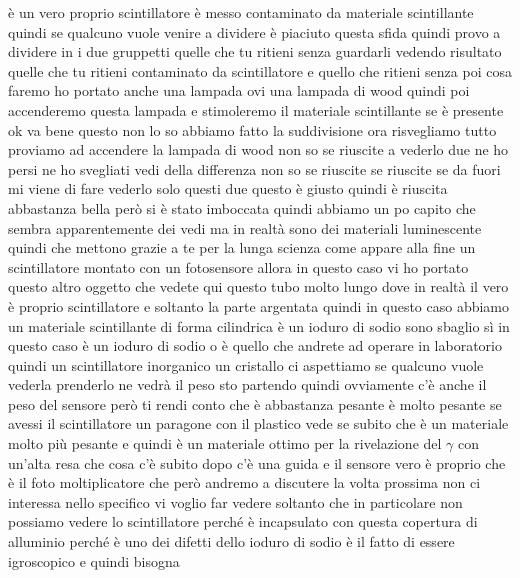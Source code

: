 {è un vero proprio scintillatore è messo contaminato da materiale scintillante quindi se qualcuno vuole venire a dividere è piaciuto questa sfida quindi provo a dividere in i due gruppetti quelle che tu ritieni senza guardarli vedendo risultato quelle che tu ritieni contaminato da scintillatore e quello che ritieni senza poi cosa faremo ho portato anche una lampada ovi una lampada di wood quindi poi accenderemo questa lampada e stimoleremo il materiale scintillante se è presente ok va bene questo non lo so abbiamo fatto la suddivisione ora risvegliamo tutto proviamo ad accendere la lampada di wood non so se riuscite a vederlo due ne ho persi ne ho svegliati vedi della differenza non so se riuscite se riuscite se da fuori mi viene di fare vederlo solo questi due questo è giusto quindi è riuscita abbastanza bella però si è stato imboccata quindi abbiamo un po capito che sembra apparentemente dei vedi ma in realtà sono dei materiali luminescente quindi che mettono grazie a te per la lunga scienza come appare alla fine un scintillatore montato con un fotosensore allora in questo caso vi ho portato questo altro oggetto che vedete qui questo tubo molto lungo dove in realtà il vero è proprio scintillatore e soltanto la parte argentata quindi in questo caso abbiamo un materiale scintillante di forma cilindrica è un ioduro di sodio sono sbaglio sì in questo caso è un ioduro di sodio o è quello che andrete ad operare in laboratorio quindi un scintillatore inorganico un cristallo ci aspettiamo se qualcuno vuole vederla prenderlo ne vedrà il peso sto partendo quindi ovviamente c'è anche il peso del sensore però ti rendi conto che è abbastanza pesante è molto pesante se avessi il scintillatore un paragone con il plastico vede se subito che è un materiale molto più pesante e quindi è un materiale ottimo per la rivelazione del $\gamma$ con un'alta resa che cosa c'è subito dopo c'è una guida e il sensore vero è proprio che è il foto moltiplicatore che però andremo a discutere la volta prossima non ci interessa nello specifico vi voglio far vedere soltanto che in particolare non possiamo vedere lo scintillatore perché è incapsulato con questa copertura di alluminio perché è uno dei difetti dello ioduro di sodio è il fatto di essere igroscopico e quindi bisogna 
}

\begin{figure}[H]
   \centering
\end{figure}


